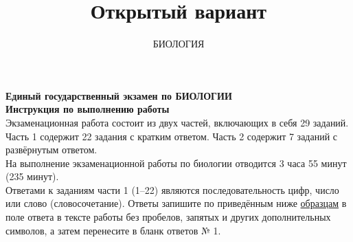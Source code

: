 \documentclass[10pt,a4paper,twocolumn,landscape]{article}
\title{Открытый вариант}
\author{БИОЛОГИЯ}
\newcommand{\sepline}{\vspace{1em}}
\begin{document}
\begin{center}
	\textsf{\textbf{Единый государственный экзамен по БИОЛОГИИ \\
	Инструкция по выполнению работы \\}}
	\sepline
	Экзаменационная работа состоит из двух частей, включающих в себя
	29 заданий. Часть 1 содержит 22 задания с кратким ответом. Часть 2
	содержит 7 заданий с развёрнутым ответом. \\
	На выполнение экзаменационной работы по биологии отводится 3 часа
	55 минут (235 минут). \\
	Ответами к заданиям части 1 (1–22) являются последовательность
	цифр, число или слово (словосочетание). Ответы запишите по приведённым
	ниже \underline{образцам} в поле ответа в тексте работы без пробелов, запятых и других
	дополнительных символов, а затем перенесите в бланк ответов № 1.



\end{center}
\end{document}
